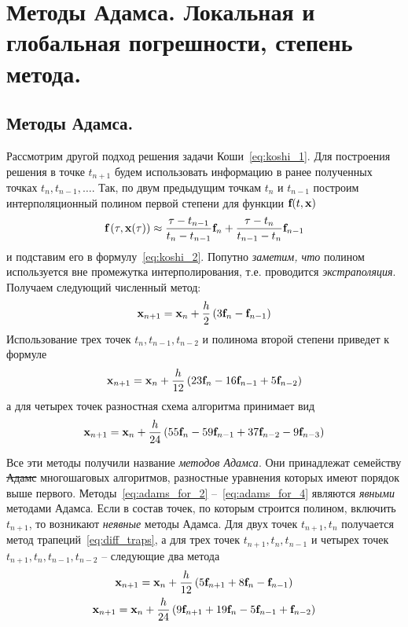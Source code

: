 \section{Методы Адамса. Локальная и глобальная погрешности, степень метода.}\label{sec:ch25}

\subsection{Методы Адамса.}
Рассмотрим другой подход решения задачи Коши~\eqref{eq:koshi_1}. Для построения решения в точке $t_{n+1}$ будем
использовать информацию в ранее полученных точках $t_n, t_{n-1}, \ldots$. Так, по двум предыдущим точкам $t_n$ и
$t_{n-1}$ построим интерполяционный полином первой степени для функции $\bf{f}(t, \bf{x})$
\begin{equation*}
    \bf{f}\left( \tau, \bf{x}(\tau) \right) \approx \frac{\tau - t_{n-1}}{t_n - t_{n-1}}\bf{f}_n + \frac{\tau - t_n}{t_{n-1} - t_n}\bf{f}_{n-1}
\end{equation*}
и подставим его в формулу~\eqref{eq:koshi_2}. Попутно \emph{заметим, что} полином используется вне промежутка
интерполирования, т.е. проводится \emph{экстраполяция}. Получаем следующий численный метод:
\begin{equation}
    \bf{x}_{n+1} = \bf{x}_n + \frac{h}{2}\left( 3\bf{f}_n - \bf{f}_{n-1} \right) \label{eq:adams_for_2}
\end{equation}
Использование трех точек $t_n, t_{n-1}, t_{n-2}$ и полинома второй степени приведет к формуле
\begin{equation}
    \bf{x}_{n+1} = \bf{x}_n + \frac{h}{12}\left( 23\bf{f}_n - 16\bf{f}_{n-1} + 5\bf{f}_{n-2} \right) \label{eq:adams_for_3}
\end{equation}
а для четырех точек разностная схема алгоритма принимает вид
\begin{equation}
    \bf{x}_{n+1} = \bf{x}_n + \frac{h}{24}\left( 55\bf{f}_n - 59\bf{f}_{n-1} + 37\bf{f}_{n-2} - 9\bf{f}_{n-3} \right) \label{eq:adams_for_4}
\end{equation}

Все эти методы получили название \emph{методов Адамса}. Они принадлежат семейству \sout{Адамс} многошаговых алгоритмов, разностные
уравнения которых имеют порядок выше первого. Методы~\eqref{eq:adams_for_2} --~\eqref{eq:adams_for_4} являются
\emph{явными} методами Адамса. Если в состав точек, по которым строится полином, включить $t_{n+1}$, то возникают
\emph{неявные} методы Адамса. Для двух точек $t_{n+1}, t_n$ получается метод трапеций~\eqref{eq:diff_traps}, а для
трех точек  $t_{n+1}, t_n, t_{n-1}$ и четырех точек $t_{n+1}, t_n, t_{n-1}, t_{n-2}$ -- следующие два метода
\begin{gather}
    \bf{x}_{n+1} = \bf{x}_n + \frac{h}{12}\left( 5\bf{f}_{n+1} + 8\bf{f}_n - \bf{f}_{n-1} \right) \label{eq:adams_for_2p1} \\
    \bf{x}_{n+1} = \bf{x}_n + \frac{h}{24}\left( 9\bf{f}_{n+1} + 19\bf{f}_n - 5\bf{f}_{n-1} + \bf{f}_{n-2} \right) \label{eq:adams_for_3p1}
\end{gather}
\vspace{5pt}

